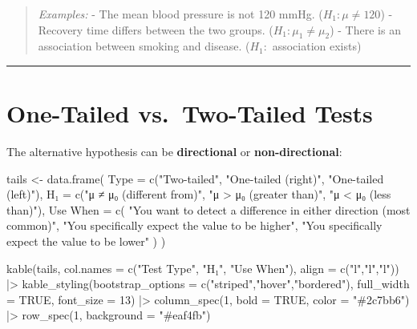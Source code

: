 \documentclass[
  12pt,
  letterpaper,
]{book}
\newenvironment{Shaded}{\begin{snugshade}}{\end{snugshade}}
\newcommand{\AttributeTok}[1]{\textcolor[rgb]{0.40,0.45,0.13}{#1}}
\newcommand{\ConstantTok}[1]{\textcolor[rgb]{0.56,0.35,0.01}{#1}}
\newcommand{\DecValTok}[1]{\textcolor[rgb]{0.68,0.00,0.00}{#1}}
\newcommand{\FunctionTok}[1]{\textcolor[rgb]{0.28,0.35,0.67}{#1}}
\newcommand{\NormalTok}[1]{\textcolor[rgb]{0.00,0.23,0.31}{#1}}
\newcommand{\OtherTok}[1]{\textcolor[rgb]{0.00,0.23,0.31}{#1}}
\newcommand{\SpecialCharTok}[1]{\textcolor[rgb]{0.37,0.37,0.37}{#1}}
\newcommand{\StringTok}[1]{\textcolor[rgb]{0.13,0.47,0.30}{#1}}
\begin{document}
\begin{quote}
\emph{Examples:} - The mean blood pressure is not 120 mmHg.
(\(H_1: \mu \neq 120\)) - Recovery time differs between the two groups.
(\(H_1: \mu_1 \neq \mu_2\)) - There is an association between smoking
and disease. (\(H_1:\) association exists)
\end{quote}

\begin{center}\rule{0.5\linewidth}{0.5pt}\end{center}

\section{One-Tailed vs.~Two-Tailed
Tests}\label{one-tailed-vs.-two-tailed-tests}

The alternative hypothesis can be \textbf{directional} or
\textbf{non-directional}:

\begin{Shaded}
\begin{Highlighting}[]
\NormalTok{tails }\OtherTok{\textless{}{-}} \FunctionTok{data.frame}\NormalTok{(}
  \AttributeTok{Type =} \FunctionTok{c}\NormalTok{(}\StringTok{"Two{-}tailed"}\NormalTok{, }\StringTok{"One{-}tailed (right)"}\NormalTok{, }\StringTok{"One{-}tailed (left)"}\NormalTok{),}
  \StringTok{\textasciigrave{}}\AttributeTok{H₁}\StringTok{\textasciigrave{}} \OtherTok{=} \FunctionTok{c}\NormalTok{(}\StringTok{"μ ≠ μ₀  (different from)"}\NormalTok{, }\StringTok{"μ \textgreater{} μ₀  (greater than)"}\NormalTok{, }\StringTok{"μ \textless{} μ₀  (less than)"}\NormalTok{),}
  \StringTok{\textasciigrave{}}\AttributeTok{Use When}\StringTok{\textasciigrave{}} \OtherTok{=} \FunctionTok{c}\NormalTok{(}
    \StringTok{"You want to detect a difference in either direction (most common)"}\NormalTok{,}
    \StringTok{"You specifically expect the value to be higher"}\NormalTok{,}
    \StringTok{"You specifically expect the value to be lower"}
\NormalTok{  )}
\NormalTok{)}

\FunctionTok{kable}\NormalTok{(tails, }\AttributeTok{col.names =} \FunctionTok{c}\NormalTok{(}\StringTok{"Test Type"}\NormalTok{, }\StringTok{"H₁"}\NormalTok{, }\StringTok{"Use When"}\NormalTok{),}
      \AttributeTok{align =} \FunctionTok{c}\NormalTok{(}\StringTok{"l"}\NormalTok{,}\StringTok{"l"}\NormalTok{,}\StringTok{"l"}\NormalTok{)) }\SpecialCharTok{|\textgreater{}}
  \FunctionTok{kable\_styling}\NormalTok{(}\AttributeTok{bootstrap\_options =} \FunctionTok{c}\NormalTok{(}\StringTok{"striped"}\NormalTok{,}\StringTok{"hover"}\NormalTok{,}\StringTok{"bordered"}\NormalTok{),}
                \AttributeTok{full\_width =} \ConstantTok{TRUE}\NormalTok{, }\AttributeTok{font\_size =} \DecValTok{13}\NormalTok{) }\SpecialCharTok{|\textgreater{}}
  \FunctionTok{column\_spec}\NormalTok{(}\DecValTok{1}\NormalTok{, }\AttributeTok{bold =} \ConstantTok{TRUE}\NormalTok{, }\AttributeTok{color =} \StringTok{"\#2c7bb6"}\NormalTok{) }\SpecialCharTok{|\textgreater{}}
  \FunctionTok{row\_spec}\NormalTok{(}\DecValTok{1}\NormalTok{, }\AttributeTok{background =} \StringTok{"\#eaf4fb"}\NormalTok{)}
\end{Highlighting}
\end{Shaded}
\end{document}
